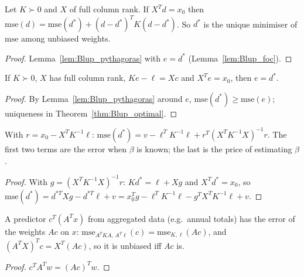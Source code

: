 \begin{theorem}\label{thm:Blup_optimal}
  \leanok
  Let $K \succ 0$ and $X$ of full column rank. If $X^Td = x_0$ then
  $\mathrm{mse}(d) = \mathrm{mse}(d^*) + (d-d^*)^TK(d-d^*)$. So $d^*$ is the unique
  minimiser of $\mathrm{mse}$ among unbiased weights.
\end{theorem}
\begin{proof}
  \leanok
  Lemma~\ref{lem:Blup_pythagoras} with $e = d^*$ (Lemma~\ref{lem:Blup_foc}).
\end{proof}

\begin{corollary}\label{cor:Blup_eq_of_normal}
  \leanok
  If $K \succ 0$, $X$ has full column rank, $Ke - \ell = Xc$ and $X^Te = x_0$, then
  $e = d^*$.
\end{corollary}
\begin{proof}
  \leanok
  By Lemma~\ref{lem:Blup_pythagoras} around $e$, $\mathrm{mse}(d^*) \ge \mathrm{mse}(e)$;
  uniqueness in Theorem~\ref{thm:Blup_optimal}.
\end{proof}

\begin{theorem}\label{thm:Blup_mse}
  \leanok
  With $r = x_0 - X^TK^{-1}\ell$:
  $\mathrm{mse}(d^*) = v - \ell^TK^{-1}\ell + r^T(X^TK^{-1}X)^{-1}r$. The first two terms
  are the error when $\beta$ is known; the last is the price of estimating $\beta$.
\end{theorem}
\begin{proof}
  \leanok
  With $g = (X^TK^{-1}X)^{-1}r$: $Kd^* = \ell + Xg$ and $X^Td^* = x_0$, so
  $\mathrm{mse}(d^*) = d^{*T}Xg - d^{*T}\ell + v = x_0^Tg - \ell^TK^{-1}\ell
  - g^TX^TK^{-1}\ell + v$.
\end{proof}

\begin{lemma}\label{lem:Blup_aggregate}
  \leanok
  A predictor $c^T(A^Tx)$ from aggregated data (e.g.\ annual totals) has the error of the
  weights $Ac$ on $x$: $\mathrm{mse}_{A^TKA,\,A^T\ell}(c) = \mathrm{mse}_{K,\ell}(Ac)$, and
  $(A^TX)^Tc = X^T(Ac)$, so it is unbiased iff $Ac$ is.
\end{lemma}
\begin{proof}
  \leanok
  $c^TA^Tw = (Ac)^Tw$.
\end{proof}

